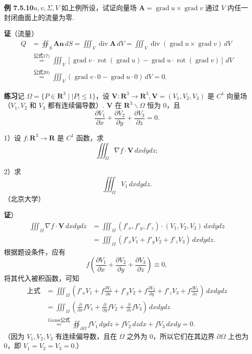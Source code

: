 \documentclass[UTF8, 12pt, fontset=fandol, oneside]{ctexart}
\begin{document}
\noindent\textbf{例 7.5.10}\quad $u,v,\Sigma,V$ 如上例所设，试证向量场 $\mathbf A=\operatorname{grad}u\times\operatorname{grad}v$ 通过 $V$ 内任一封闭曲面上的流量为零.

\noindent\textbf{证}\quad （流量）
\[
\begin{aligned}
Q&=\oiint_S \mathbf A\mathbf n\,dS
=\iiint_V\operatorname{div}\mathbf A\,dV
=\iiint_V\operatorname{div}(\operatorname{grad}u\times\operatorname{grad}v)\,dV\\
&\overset{\text{公式17)}}{=}\iiint_V[\operatorname{grad}v\cdot\operatorname{rot}(\operatorname{grad}u)-\operatorname{grad}u\cdot\operatorname{rot}(\operatorname{grad}v)]\,dV\\
&\overset{\text{公式20)}}{=}\iiint_V(\operatorname{grad}v\cdot0-\operatorname{grad}u\cdot0)\,dV=0.
\end{aligned}
\]

\noindent\textbf{练习}\quad 记 $\Omega=\{P\in\mathbf R^3\mid |P|\leqslant1\}$，设 $\mathbf V:\mathbf R^3\to\mathbf R^3,\mathbf V=(V_1,V_2,V_3)$ 是 $C^1$ 向量场（$V_1,V_2$ 和 $V_3$ 都有连续偏导数）. $\mathbf V$ 在 $\mathbf R^3\backslash\Omega$ 恒为 0，且
\[
\frac{\partial V_1}{\partial x}+\frac{\partial V_2}{\partial y}+\frac{\partial V_3}{\partial z}=0.
\]

1）设 $f:\mathbf R^3\to\mathbf R$ 是 $C^1$ 函数，求
\[
\iiint_\Omega \nabla f\cdot\mathbf V\,dxdy dz;
\]

2）求
\[
\iiint_\Omega V_1\,dxdy dz.
\]
（北京大学）

\noindent\textbf{证}）
\[
\begin{aligned}
\iiint_\Omega \nabla f\cdot\mathbf V\,dxdy dz
&=\iiint_\Omega(f'_x,f'_y,f'_z)\cdot(V_1,V_2,V_3)\,dxdy dz\\
&=\iiint_\Omega(f'_xV_1+f'_yV_2+f'_zV_3)\,dxdy dz.
\end{aligned}
\]
根据题设条件，应有
\[
f\left(\frac{\partial V_1}{\partial x}+\frac{\partial V_2}{\partial y}+\frac{\partial V_3}{\partial z}\right)\equiv0,
\]
将其代入被积函数，可知
\[
\begin{aligned}
\text{上式}
&=\iiint_\Omega\left(f'_xV_1+f\frac{\partial V_1}{\partial x}+f'_yV_2+f\frac{\partial V_2}{\partial y}+f'_zV_3+f\frac{\partial V_3}{\partial z}\right)\,dxdy dz\\
&=\iiint_\Omega\left(\frac\partial{\partial x}fV_1+\frac\partial{\partial y}fV_2+\frac\partial{\partial z}fV_3\right)\,dxdy dz\\
&\overset{\text{Gauss公式}}{=}\oiint_{\partial\Omega}fV_1\,dydz+fV_2\,dzdx+fV_3\,dxdy=0.
\end{aligned}
\]
（因为 $V_1,V_2,V_3$ 有连续偏导数，且在 $\Omega$ 之外为 0，所以它们在其边界 $\partial\Omega$ 上也为 0，即 $V_1=V_2=V_3=0$.）
\end{document}
